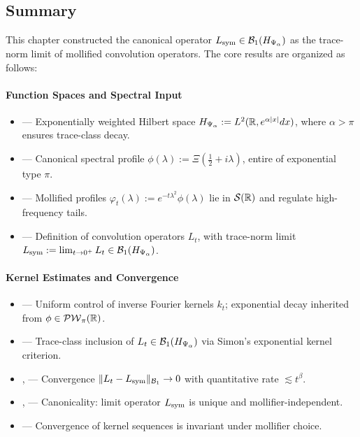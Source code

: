 \subsection*{Summary}

This chapter constructed the canonical operator \( L_{\mathrm{sym}} \in \mathcal{B}_1(H_{\Psi_\alpha}) \) as the trace-norm limit of mollified convolution operators. The core results are organized as follows:

\paragraph{Function Spaces and Spectral Input}
\begin{itemize}
  \item {} — Exponentially weighted Hilbert space \( H_{\Psi_\alpha} := L^2(\mathbb{R}, e^{\alpha |x|} dx) \), where \( \alpha > \pi \) ensures trace-class decay.
  \item {} — Canonical spectral profile \( \phi(\lambda) := \Xi(\tfrac{1}{2} + i\lambda) \), entire of exponential type \( \pi \).
  \item {} — Mollified profiles \( \varphi_t(\lambda) := e^{-t\lambda^2} \phi(\lambda) \) lie in \( \mathcal{S}(\mathbb{R}) \) and regulate high-frequency tails.
  \item {} — Definition of convolution operators \( L_t \), with trace-norm limit \( L_{\mathrm{sym}} := \lim_{t \to 0^+} L_t \in \mathcal{B}_1(H_{\Psi_\alpha}) \).
\end{itemize}

\paragraph{Kernel Estimates and Convergence}
\begin{itemize}
  \item {} — Uniform control of inverse Fourier kernels \( k_t \); exponential decay inherited from \( \phi \in \mathcal{PW}_{\pi}(\mathbb{R}) \).
  \item {} — Trace-class inclusion of \( L_t \in \mathcal{B}_1(H_{\Psi_\alpha}) \) via Simon's exponential kernel criterion.
  \item {},  — Convergence \( \|L_t - L_{\mathrm{sym}}\|_{\mathcal{B}_1} \to 0 \) with quantitative rate \( \lesssim t^\beta \).
  \item {},  — Canonicality: limit operator \( L_{\mathrm{sym}} \) is unique and mollifier-independent.
  \item {} — Convergence of kernel sequences is invariant under mollifier choice.
\end{itemize}

